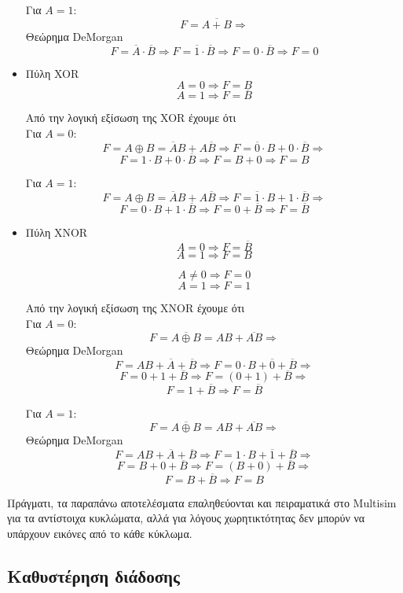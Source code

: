 \documentclass{article}
\begin{document}
\begin{itemize}
	Για $A = 1$:
	\[F = \overline{A + B} \Rightarrow\]
	Θεώρημα DeMorgan
	\[F = \overline{A} \cdot \overline{B} \Rightarrow F = \overline{1}
	\cdot \overline{B} \Rightarrow
	F = 0 \cdot \overline{B} \Rightarrow F = 0\]

	\item
	Πύλη XOR
	\[A = 0 \Rightarrow F = B\]
	\[A = 1 \Rightarrow F = \overline{B}\]

	Από την λογική εξίσωση της XOR έχουμε ότι \\

	Για $A = 0$:
	\[F = A \oplus B = \overline{A}B + A\overline{B} \Rightarrow
	F = \overline{0} \cdot B + 0 \cdot \overline{B} \Rightarrow\]
	\[F = 1 \cdot B + 0 \cdot \overline{B} \Rightarrow
	F = B + 0 \Rightarrow F = B\]

	Για $A = 1$:
	\[F = A \oplus B = \overline{A}B + A\overline{B} \Rightarrow
	F = \overline{1} \cdot B + 1 \cdot \overline{B} \Rightarrow\]
	\[F = 0 \cdot B + 1 \cdot \overline{B} \Rightarrow
	F = 0 + \overline{B} \Rightarrow F = \overline{B}\]

	\item
	Πύλη XNOR
	\[A = 0 \Rightarrow F = \overline{B}\]
	\[A = 1 \Rightarrow F = B\]

	\[A \neq 0 \Rightarrow F = 0\]
	\[A = 1 \Rightarrow F = 1\]

	Από την λογική εξίσωση της XNOR έχουμε ότι \\

	Για $A = 0$:
	\[F = \overline{A \oplus B} = AB + \overline{AB} \Rightarrow\]
	Θεώρημα DeMorgan
	\[F = AB + \overline{A} + \overline{B} \Rightarrow
	F = 0 \cdot B + \overline{0} + \overline{B} \Rightarrow\]
	\[F = 0 + 1 + \overline{B} \Rightarrow F = (0 + 1) + \overline{B}
	\Rightarrow\]
	\[F = 1 + \overline{B} \Rightarrow F = \overline{B}\]

	Για $A = 1$:
	\[F = \overline{A \oplus B} = AB + \overline{AB} \Rightarrow\]
	Θεώρημα DeMorgan
	\[F = AB + \overline{A} + \overline{B} \Rightarrow
	F = 1 \cdot B + \overline{1} + \overline{B} \Rightarrow\]
	\[F = B + 0 + \overline{B} \Rightarrow F = (B + 0) + \overline{B}
		\Rightarrow\]
	\[F = B + \overline{B} \Rightarrow F = B\]
\end{itemize}

Πράγματι, τα παραπάνω αποτελέσματα επαληθεύονται και πειραματικά στο Multisim για
τα αντίστοιχα κυκλώματα, αλλά για λόγους χωρητικτότητας δεν μπορύν να υπάρχουν εικόνες
από το κάθε κύκλωμα.

\subsection{Καθυστέρηση διάδοσης}
\end{document}
